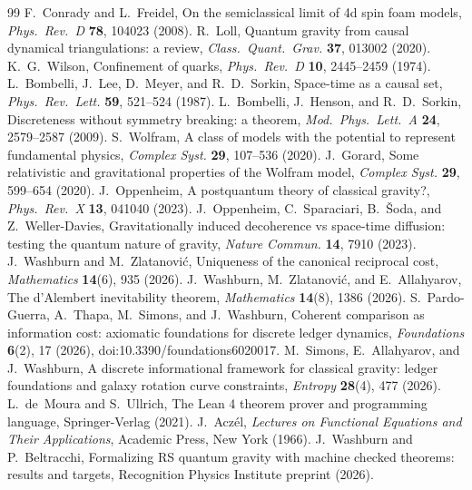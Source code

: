 \documentclass[11pt,letterpaper]{article}
\begin{document}
\begin{thebibliography}{99}
 F.~Conrady and L.~Freidel, On the semiclassical limit of 4d spin foam models, \emph{Phys.\ Rev.\ D} \textbf{78}, 104023 (2008).
 R.~Loll, Quantum gravity from causal dynamical triangulations: a review, \emph{Class.\ Quant.\ Grav.} \textbf{37}, 013002 (2020).
 K.~G.~Wilson, Confinement of quarks, \emph{Phys.\ Rev.\ D} \textbf{10}, 2445--2459 (1974).
 L.~Bombelli, J.~Lee, D.~Meyer, and R.~D.~Sorkin, Space-time as a causal set, \emph{Phys.\ Rev.\ Lett.} \textbf{59}, 521--524 (1987).
 L.~Bombelli, J.~Henson, and R.~D.~Sorkin, Discreteness without symmetry breaking: a theorem, \emph{Mod.\ Phys.\ Lett.\ A} \textbf{24}, 2579--2587 (2009).
 S.~Wolfram, A class of models with the potential to represent fundamental physics, \emph{Complex Syst.} \textbf{29}, 107--536 (2020).
 J.~Gorard, Some relativistic and gravitational properties of the Wolfram model, \emph{Complex Syst.} \textbf{29}, 599--654 (2020).
 J.~Oppenheim, A postquantum theory of classical gravity?, \emph{Phys.\ Rev.\ X} \textbf{13}, 041040 (2023).
 J.~Oppenheim, C.~Sparaciari, B.~\v{S}oda, and Z.~Weller-Davies, Gravitationally induced decoherence vs space-time diffusion: testing the quantum nature of gravity, \emph{Nature Commun.} \textbf{14}, 7910 (2023).
 J.~Washburn and M.~Zlatanovi\'c, Uniqueness of the canonical reciprocal cost, \emph{Mathematics} \textbf{14}(6), 935 (2026).
 J.~Washburn, M.~Zlatanovi\'c, and E.~Allahyarov, The d'Alembert inevitability theorem, \emph{Mathematics} \textbf{14}(8), 1386 (2026).
 S.~Pardo-Guerra, A.~Thapa, M.~Simons, and J.~Washburn, Coherent comparison as information cost: axiomatic foundations for discrete ledger dynamics, \emph{Foundations} \textbf{6}(2), 17 (2026), doi:10.3390/foundations6020017.
 M.~Simons, E.~Allahyarov, and J.~Washburn, A discrete informational framework for classical gravity: ledger foundations and galaxy rotation curve constraints, \emph{Entropy} \textbf{28}(4), 477 (2026).
 L.~de~Moura and S.~Ullrich, The Lean 4 theorem prover and programming language, Springer-Verlag (2021).
 J.~Acz\'el, \emph{Lectures on Functional Equations and Their Applications}, Academic Press, New York (1966).
 J.~Washburn and P.~Beltracchi, Formalizing RS quantum gravity with machine checked theorems: results and targets, Recognition Physics Institute preprint (2026).

\end{thebibliography}
\end{document}
